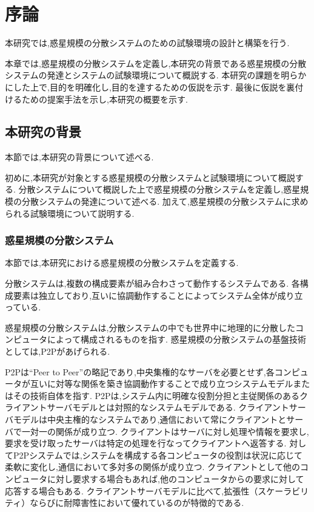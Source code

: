\chapter{序論}
\label{introduction}

本研究では,惑星規模の分散システムのための試験環境の設計と構築を行う.

本章では,惑星規模の分散システムを定義し,本研究の背景である惑星規模の分散システムの発達とシステムの試験環境について概説する.
本研究の課題を明らかにした上で,目的を明確化し,目的を達するための仮説を示す.
最後に仮説を裏付けるための提案手法を示し,本研究の概要を示す.

\section{本研究の背景}
\label{introduction:background}

本節では,本研究の背景について述べる.

初めに,本研究が対象とする惑星規模の分散システムと試験環境について概説する.
分散システムについて概説した上で惑星規模の分散システムを定義し,惑星規模の分散システムの発達について述べる.
加えて,惑星規模の分散システムに求められる試験環境について説明する.

\subsection{惑星規模の分散システム}

本節では,本研究における惑星規模の分散システムを定義する.

分散システムは,複数の構成要素が組み合わさって動作するシステムである.
各構成要素は独立しており,互いに協調動作することによってシステム全体が成り立っている.

惑星規模の分散システムは,分散システムの中でも世界中に地理的に分散したコンピュータによって構成されるものを指す.
惑星規模の分散システムの基盤技術としては,P2Pがあげられる.

P2Pは``Peer to Peer''の略記であり,中央集権的なサーバを必要とせず,各コンピュータが互いに対等な関係を築き協調動作することで成り立つシステムモデルまたはその技術自体を指す.
P2Pは,システム内に明確な役割分担と主従関係のあるクライアントサーバモデルとは対照的なシステムモデルである.
クライアントサーバモデルは中央主権的なシステムであり,通信において常にクライアントとサーバで一対一の関係が成り立つ.
クライアントはサーバに対し処理や情報を要求し,要求を受け取ったサーバは特定の処理を行なってクライアントへ返答する.
対してP2Pシステムでは,システムを構成する各コンピュータの役割は状況に応じて柔軟に変化し,通信において多対多の関係が成り立つ.
クライアントとして他のコンピュータに対し要求する場合もあれば,他のコンピュータからの要求に対して応答する場合もある.
クライアントサーバモデルに比べて,拡張性（スケーラビリティ）ならびに耐障害性において優れているのが特徴的である.

